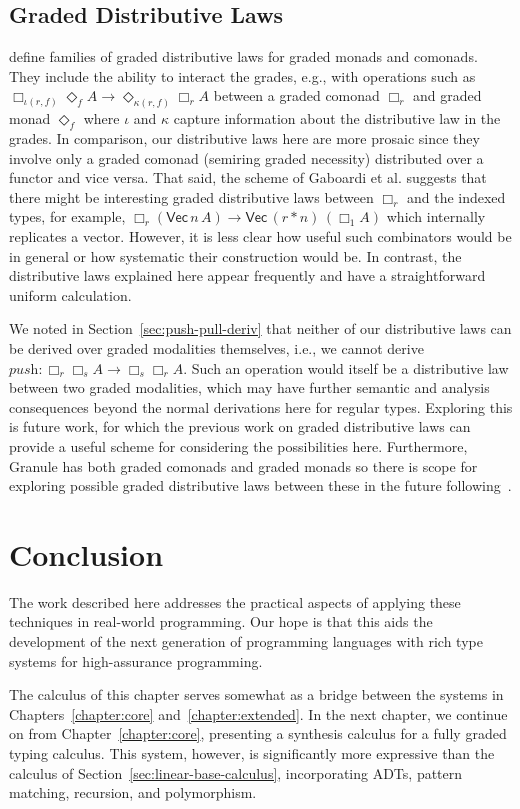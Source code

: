 \subsection{Graded Distributive Laws}
\citet{DBLP:conf/icfp/GaboardiKOBU16} define families of graded distributive laws for graded monads
and comonads. They include the ability to interact the
grades, e.g., with operations such as $\Box_{\iota(r,f)} \Diamond_f A
\rightarrow \Diamond_{\kappa(r,f)} \Box_r A$ between a graded comonad $\Box_r$
and graded monad $\Diamond_f$ where $\iota$ and $\kappa$ capture information
about the distributive law in the grades. In comparison, our distributive laws
here are more prosaic since they involve only a graded comonad (semiring graded
necessity) distributed over a functor and vice versa. That said, the scheme of
Gaboardi et al. suggests that there might be interesting graded distributive
laws between $\Box_r$ and the indexed types, for example, $\Box_r
(\mathsf{Vec}\, n \, A) \rightarrow \mathsf{Vec}\, (r * n) \, (\Box_1 A)$ which
internally replicates a vector. However, it is less clear how useful such
combinators would be in general or how systematic their construction would be.
In contrast, the distributive laws explained here appear frequently and have a
straightforward uniform calculation.

We noted in Section~\ref{sec:push-pull-deriv} that neither of our distributive laws
can be derived over graded modalities themselves, i.e., we cannot derive
$\textit{push} : \Box_r \Box_s A \rightarrow \Box_s \Box_r A$. Such an operation
would itself be a distributive law between two graded modalities, which may have
further semantic and analysis consequences beyond the normal derivations here
for regular types. Exploring this is future work, for which the previous work on
graded distributive laws can provide a useful scheme for considering the
possibilities here. Furthermore, Granule has both graded comonads and graded
monads so there is scope for exploring possible graded distributive laws between
these in the future following~\citet{DBLP:conf/icfp/GaboardiKOBU16}.

\section{Conclusion}
\label{sec:der-conclusion}

The work described here addresses the practical aspects of applying these
techniques in real-world programming. Our hope is that this aids the development
of the next generation of programming languages with rich type systems for
high-assurance programming.

The calculus of this chapter serves somewhat as a bridge between the systems in
Chapters~\ref{chapter:core} and~\ref{chapter:extended}. In the next chapter, we
continue on from Chapter~\ref{chapter:core}, presenting a synthesis calculus for
a fully graded typing calculus. This system, however, is significantly more
expressive than the calculus of Section~\ref{sec:linear-base-calculus},
incorporating ADTs, pattern matching, recursion, and  
polymorphism. 